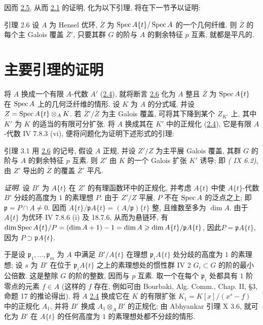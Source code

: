 因而 \hyperref[XV.lem2.5]{2.5}, 从而 \hyperref[XV.thm2.1]{2.1} 的证明, 化为以下引理, 将在下一节予以证明:

\begin{enonce*}{引理 2.6}
设 $A$ 为 Hensel 优环, $\bar Z$ 为 $\operatorname{Spec} A\{t\}/\operatorname{Spec} A$ 的一个几何纤维. 则 $\bar Z$ 的每个主 Galois 覆盖 $\bar Z'$, 只要其群 $G$ 的阶与 $A$ 的剩余特征 $p$ 互素, 就都是平凡的.
\end{enonce*}

\section{主要引理的证明}\pageoriginale

将 $A$ 换成一个有限 $A$-代数 $A'$ (\cf \hyperref[XV.cor2.4]{2.4}), 就将断言 \hyperref[XV.lem2.6]{2.6} 化为 $A$ 整且 $\bar{Z}$ 为 $\operatorname{Spec} A\{t\}$ 在 $\operatorname{Spec} A$ 上的几何泛纤维的情形. 设 $K$ 为 $A$ 的分式域, 并设 $Z=\operatorname{Spec} A\{t\}\otimes_A K$. 若 $\bar{Z}'/\bar{Z}$ 为主 Galois 覆盖, 可将其下降到某个 $Z_{K'}$ 上, 其中 $K'$ 为 $K$ 的适当的有限可分扩张. 将 $A$ 换成其在 $K'$ 中的正规化 (\hyperref[XV.cor2.4]{2.4}), 它是有限 $A$-代数 \sisi{(}{}\EGA IV 7.8.3 (vi)\sisi{)}{}, 便将问题化为证明下述形式的引理:

\begin{enonce*}{引理 3.1}
用 \hyperref[XV.lem2.6]{2.6} 的记号, 假设 $A$ 正规, 并设 $Z'/Z$ 为主平展 Galois 覆盖, 其群 $G$ 的阶与 $A$ 的剩余特征 $p$ 互素. 则 $Z'$ 由 $K$ 的一个 Galois 扩张 $K'$ 诱导; 即 \emph{( IX 6.2)}, 由 $Z'$ 导出的 $\bar{Z}$ 的覆盖 $\bar{Z}'$ 平凡.
\end{enonce*}

\noindent
\emph{证明}. 设 $B'$ 为 $A\{t\}$ 在 $Z'$ 的有理函数环中的正规化, 并考虑 $A\{t\}$ 中使 $A\{t\}$-代数 $B'$ 分歧的高度为 $1$ 的素理想 $P$. 由于 $Z'/Z$ 平展, $P$ 不在 $\operatorname{Spec} A$ 的泛点之上; 即 $\mathfrak{p}=P\cap A\neq 0$. 因而 $A\{t\}/\mathfrak{p}A\{t\}=(A/\mathfrak{p})\{t\}$ 整, 且维数至多为 $\dim A$. 由于 $A\{t\}$ 为优环 \sisi{(}{}\EGA IV 7.8.6 (i) 及 18.7.6\sisi{)}{}, 从而为悬链环, 有 $\dim \operatorname{Spec} A\{t\}/P=(\dim A+1)-1=\dim A\geqslant
\dim A\{t\}/\mathfrak{p}A\{t\}$, 因此\pageoriginale $P=\mathfrak{p}A\{t\}$, 因为 $P\supset \mathfrak{p}A\{t\}$.

于是设 $\mathfrak{p}_1,\ldots,\mathfrak{p}_m$ 为 $A$ 中满足 $B'/A\{t\}$ 在理想 $\mathfrak{p}_iA\{t\}$ 处分歧的高度为 $1$ 的素理想; 设 $s$ 为 $B'$ 在位于 $\mathfrak{p}_iA\{t\}$ 之上的素理想处的惯性群 \sisi{(}{}\SGA IV 2\sisi{)}{} $G_i\subset G$ 的阶的最小公倍数. 这是整除 $G$ 的阶的整数, 因而与 $p$ 互素. 取一个在每个 $\mathfrak{p}_i$ 处都具有 $1$ 阶零点的元素 $f\in A$ (这样的 $f$ 存在, 例如可由 Bourbaki, Alg. Comm., Chap. II, \S 3, 命题 17 的推论得出). 将 $A$ \sisi{(}{}\hyperref[XV.cor2.4]{2.4}\sisi{)}{} 换成它在 $K$ 的有限扩张 $K_1=K[x]/(x^s-f)$ 中的正规化 $A_1$, 并将 $B'$ 换成 $A_1\otimes_A B'$ 的正规化; 由 Abhyankar 引理 \sisi{(}{} X 3.6\sisi{)}{}, 就可化为 $B'$ 在 $A\{t\}$ 的任何高度为 $1$ 的素理想处都不分歧的情形.

